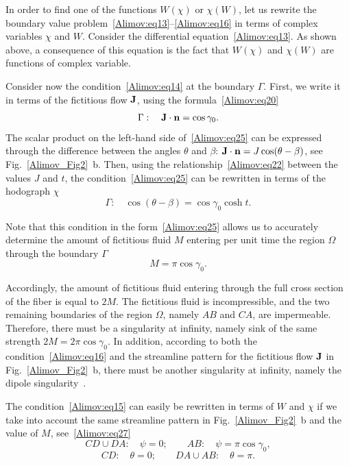 \documentclass[
11pt,%
tightenlines,%
twoside,%
onecolumn,%
nofloats,%
nobibnotes,%
nofootinbib,%
superscriptaddress,%
noshowpacs,%
centertags]%
{revtex4-2}
\begin{document}
In order to find one of the functions $W(\chi)$ or $\chi(W)$, let us rewrite the boundary value
problem~\eqref{Alimov:eq13}--\eqref{Alimov:eq16} in terms of complex variables $\chi$ and $W$.
Consider the differential equation~\eqref{Alimov:eq13}. As shown above, a consequence of this
equation is the fact that $W(\chi)$ and $\chi(W)$ are functions of complex variable.

Consider now the condition~\eqref{Alimov:eq14} at the boundary $\Gamma$. First, we write it in
terms of the fictitious flow ${\rm {\bf J}}$, using the formula~\eqref{Alimov:eq20}
\begin{equation}
\label{Alimov:eq25} \Gamma : \quad {\rm {\bf J}} \cdot {\rm {\bf n}} = \cos \gamma_0.
\end{equation}
The scalar product on the left-hand side of~\eqref{Alimov:eq25} can be expressed through the
difference between the angles $\theta$ and $\beta$: ${\rm {\bf J}} \cdot {\rm {\bf n}} = J\cos
(\theta - \beta)$, see Fig.~\ref{Alimov_Fig2}~b. Then, using the relationship~\eqref{Alimov:eq22}
between the values $J$ and $t$, the condition~\eqref{Alimov:eq25} can be rewritten in terms of the
hodograph $\chi$
\begin{equation}
\label{Alimov:eq26} \Gamma :\quad \cos (\theta - \beta ) = \cos \gamma_0 \cosh t.
\end{equation}

Note that this condition in the form~\eqref{Alimov:eq25} allows us to accurately determine the
amount of fictitious fluid $M$ entering per unit time the region $\Omega$ through the boundary
$\Gamma$
\begin{equation}
\label{Alimov:eq27} M = \pi \cos \gamma_0.
\end{equation}

Accordingly, the amount of fictitious fluid entering through the full cross section of the fiber is
equal to $2M$. The fictitious fluid is incompressible, and the two remaining boundaries of the
region $\Omega$, namely $AB$ and $CA$, are impermeable. Therefore, there must be a singularity at
infinity, namely sink of the same strength $2M = 2\pi \cos \gamma_0 $. In addition, according to
both the condition~\eqref{Alimov:eq16} and the streamline pattern for the fictitious flow ${\rm
{\bf J}}$ in Fig.~\ref{Alimov_Fig2}~b, there must be another singularity at infinity, namely the
dipole singularity~\cite{Alimov:bib18}.

The condition~\eqref{Alimov:eq15} can easily be rewritten in terms of $W$ and $\chi$ if we take
into account the same streamline pattern in Fig.~\ref{Alimov_Fig2}~b and the value of $M$,
see~\eqref{Alimov:eq27}
\begin{equation}
\label{Alimov:eq28} CD \cup DA: \quad \psi = 0; \quad \quad AB:\quad \psi = \pi \cos \gamma_0,
\end{equation}
\begin{equation}
\label{Alimov:eq29} CD:\quad \theta = 0; \quad \quad DA \cup AB:\quad \theta = \pi.
\end{equation}
\end{document}
